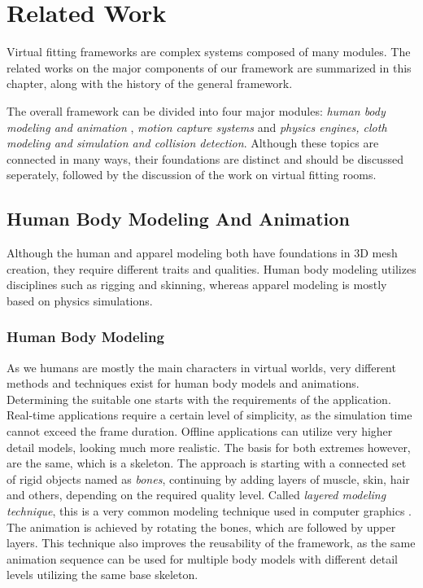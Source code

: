 \chapter{Related Work}
\label{chapter_related_work}

Virtual fitting frameworks are complex systems composed of many modules. The related works on the major components of our framework are summarized in this chapter, 
along with the history of the general framework. 

The overall framework can be divided into four major modules: \textit{human body modeling and animation} , \textit{motion capture systems} and 
\textit{physics engines, cloth modeling and simulation and collision detection}. Although these topics are connected in many ways, their foundations are distinct 
and should be discussed seperately, followed by the discussion of the work on virtual fitting rooms.

\section{Human Body Modeling And Animation}
\label{section_related_modeling}

Although the human and apparel modeling both have foundations in 3D mesh creation, they require different traits and qualities. Human body modeling utilizes disciplines such as rigging and 
skinning, whereas apparel modeling is mostly based on physics simulations.

\subsection{Human Body Modeling}
As we humans are mostly the main characters in virtual worlds, very different methods and techniques exist for human body models and animations. Determining the suitable one 
starts with the requirements of the application. Real-time applications require a certain level of simplicity, as the simulation time cannot exceed the frame duration. Offline 
applications can utilize very higher detail models, looking much more realistic. The basis for both extremes however, are the same, which is a skeleton. The approach is starting 
with a connected set of rigid objects named as \textit{bones}, continuing by adding layers of muscle, skin, hair and others, depending on the required quality level. Called \textit{layered
modeling technique}, this is a very common modeling technique used in computer graphics \cite{Chadwick1989}. The animation is achieved by rotating the bones, which are followed by 
upper layers. This technique also improves the reusability of the framework, as the same animation sequence can be used for multiple body models with different detail levels utilizing the 
same base skeleton.   

